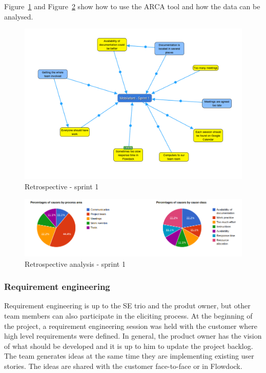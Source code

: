 Figure~\ref{fig:retro1} and Figure~\ref{fig:retro1analysis} show how to use the
ARCA tool and how the data can be analysed. 

\begin{figure}[H]
\centering
\includegraphics[width=1\textwidth]{imgs/retro-sprint1.png}
\caption{Retrospective - sprint 1}
\label{fig:retro1}
\end{figure}

\begin{figure}[H]
\centering
\includegraphics[width=1\textwidth]{imgs/retro-analysis-sprint1.png}
\caption{Retrospective analysis - sprint 1}
\label{fig:retro1analysis}
\end{figure}

\subsubsection{Requirement engineering}

Requirement engineering is up to the SE trio and the produt owner, but other
team members can also participate in the eliciting process. At the beginning of
the project, a requirement engineering session was held with the customer where
high level requirements were defined. In general, the product owner has the
vision of what should be developed and it is up to him to update the project
backlog. The team generates ideas at the same time they are implementing
existing user stories. The ideas are shared with the customer face-to-face or in
Flowdock.

